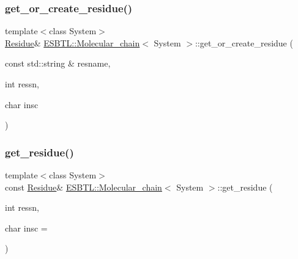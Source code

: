 \mbox{\label{classESBTL_1_1Molecular__chain_aa35aa61329884011dc85906c387df84c}} 
\subsubsection{\texorpdfstring{get\+\_\+or\+\_\+create\+\_\+residue()}{get\_or\_create\_residue()}\hspace{0.1cm}{\footnotesize\ttfamily [2/2]}}
{\footnotesize\ttfamily template$<$class System$>$ \\
\hyperlink{classESBTL_1_1Molecular__chain_a59b61e0ecde5fb4c3d1765a37c9cf6cb}{Residue}\& \hyperlink{classESBTL_1_1Molecular__chain}{E\+S\+B\+T\+L\+::\+Molecular\+\_\+chain}$<$ System $>$\+::get\+\_\+or\+\_\+create\+\_\+residue (\begin{DoxyParamCaption}\item[{const std\+::string \&}]{resname,  }\item[{int}]{ressn,  }\item[{char}]{insc }\end{DoxyParamCaption})\hspace{0.3cm}{\ttfamily [inline]}}

\mbox{\label{classESBTL_1_1Molecular__chain_add9e2713daf6374d29fc32bd0dc93ccf}} 
\subsubsection{\texorpdfstring{get\+\_\+residue()}{get\_residue()}}
{\footnotesize\ttfamily template$<$class System$>$ \\
const \hyperlink{classESBTL_1_1Molecular__chain_a59b61e0ecde5fb4c3d1765a37c9cf6cb}{Residue}\& \hyperlink{classESBTL_1_1Molecular__chain}{E\+S\+B\+T\+L\+::\+Molecular\+\_\+chain}$<$ System $>$\+::get\+\_\+residue (\begin{DoxyParamCaption}\item[{int}]{ressn,  }\item[{char}]{insc = {\ttfamily \textquotesingle{}~\textquotesingle{}} }\end{DoxyParamCaption})\hspace{0.3cm}{\ttfamily [inline]}}

